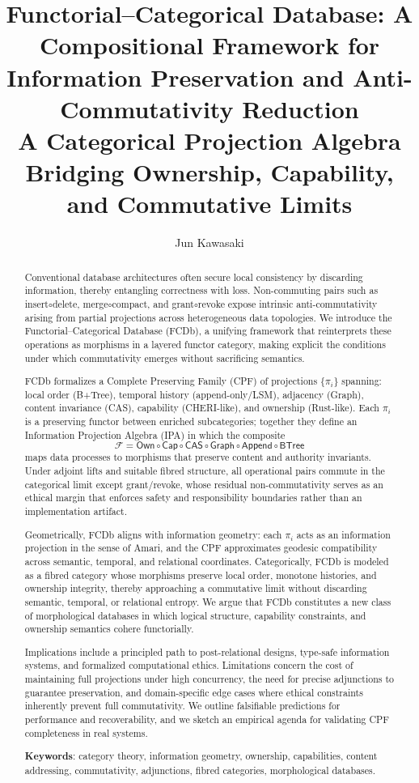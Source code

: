 \documentclass[10pt]{article}
\title{Functorial–Categorical Database: A Compositional Framework for Information Preservation and Anti-Commutativity Reduction\\
\large A Categorical Projection Algebra Bridging Ownership, Capability, and Commutative Limits}
\author{Jun Kawasaki}
\date{}
\begin{document}
\maketitle

\begin{abstract}
Conventional database architectures often secure local consistency by discarding information, thereby entangling correctness with loss. Non-commuting pairs such as insert$\circ$delete, merge$\circ$compact, and grant$\circ$revoke expose intrinsic anti-commutativity arising from partial projections across heterogeneous data topologies. We introduce the Functorial--Categorical Database (FCDb), a unifying framework that reinterprets these operations as morphisms in a layered functor category, making explicit the conditions under which commutativity emerges without sacrificing semantics.

FCDb formalizes a Complete Preserving Family (CPF) of projections $\{\pi_i\}$ spanning: local order (B+Tree), temporal history (append-only/LSM), adjacency (Graph), content invariance (CAS), capability (CHERI-like), and ownership (Rust-like). Each $\pi_i$ is a preserving functor between enriched subcategories; together they define an Information Projection Algebra (IPA) in which the composite
\[
\mathcal{F} = \mathsf{Own} \circ \mathsf{Cap} \circ \mathsf{CAS} \circ \mathsf{Graph} \circ \mathsf{Append} \circ \mathsf{BTree}
\]
maps data processes to morphisms that preserve content and authority invariants. Under adjoint lifts and suitable fibred structure, all operational pairs commute in the categorical limit except grant/revoke, whose residual non-commutativity serves as an ethical margin that enforces safety and responsibility boundaries rather than an implementation artifact.

Geometrically, FCDb aligns with information geometry: each $\pi_i$ acts as an information projection in the sense of Amari, and the CPF approximates geodesic compatibility across semantic, temporal, and relational coordinates. Categorically, FCDb is modeled as a fibred category whose morphisms preserve local order, monotone histories, and ownership integrity, thereby approaching a commutative limit without discarding semantic, temporal, or relational entropy. We argue that FCDb constitutes a new class of morphological databases in which logical structure, capability constraints, and ownership semantics cohere functorially.

Implications include a principled path to post-relational designs, type-safe information systems, and formalized computational ethics. Limitations concern the cost of maintaining full projections under high concurrency, the need for precise adjunctions to guarantee preservation, and domain-specific edge cases where ethical constraints inherently prevent full commutativity. We outline falsifiable predictions for performance and recoverability, and we sketch an empirical agenda for validating CPF completeness in real systems.

\textbf{Keywords}: category theory, information geometry, ownership, capabilities, content addressing, commutativity, adjunctions, fibred categories, morphological databases.
\end{abstract}
\end{document}
